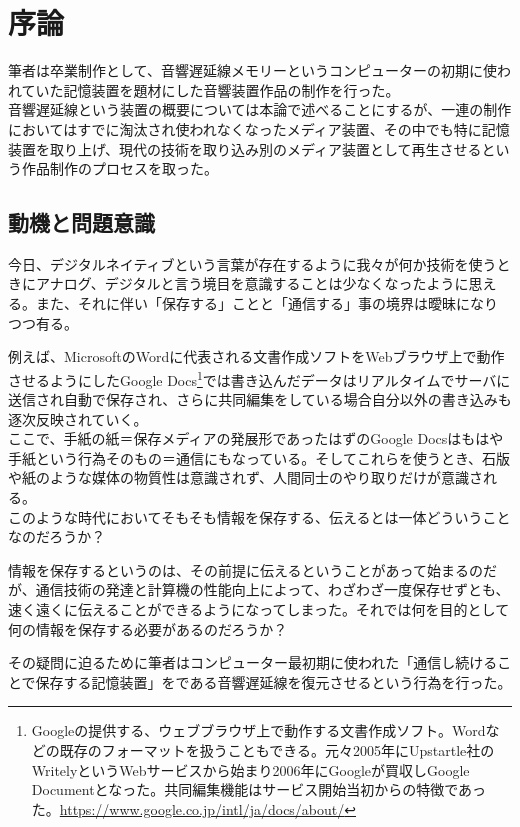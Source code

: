 \chapter{序論}\label{ux5e8fux8ad6}

筆者は卒業制作として、音響遅延線メモリーというコンピューターの初期に使われていた記憶装置を題材にした音響装置作品の制作を行った。\\
音響遅延線という装置の概要については本論で述べることにするが、一連の制作においてはすでに淘汰され使われなくなったメディア装置、その中でも特に記憶装置を取り上げ、現代の技術を取り込み別のメディア装置として再生させるという作品制作のプロセスを取った。

\section{動機と問題意識}\label{ux52d5ux6a5fux3068ux554fux984cux610fux8b58}

今日、デジタルネイティブという言葉が存在するように我々が何か技術を使うときにアナログ、デジタルと言う境目を意識することは少なくなったように思える。また、それに伴い「保存する」ことと「通信する」事の境界は曖昧になりつつ有る。

例えば、MicrosoftのWordに代表される文書作成ソフトをWebブラウザ上で動作させるようにしたGoogle
Docs\footnote{Googleの提供する、ウェブブラウザ上で動作する文書作成ソフト。Wordなどの既存のフォーマットを扱うこともできる。元々2005年にUpstartle社のWritelyというWebサービスから始まり2006年にGoogleが買収しGoogle
  Documentとなった。共同編集機能はサービス開始当初からの特徴であった。\url{https://www.google.co.jp/intl/ja/docs/about/}}では書き込んだデータはリアルタイムでサーバに送信され自動で保存され、さらに共同編集をしている場合自分以外の書き込みも逐次反映されていく。\\
ここで、手紙の紙＝保存メディアの発展形であったはずのGoogle
Docsはもはや手紙という行為そのもの＝通信にもなっている。そしてこれらを使うとき、石版や紙のような媒体の物質性は意識されず、人間同士のやり取りだけが意識される。\\
このような時代においてそもそも情報を保存する、伝えるとは一体どういうことなのだろうか？

情報を保存するというのは、その前提に伝えるということがあって始まるのだが、通信技術の発達と計算機の性能向上によって、わざわざ一度保存せずとも、速く遠くに伝えることができるようになってしまった。それでは何を目的として何の情報を保存する必要があるのだろうか？

その疑問に迫るために筆者はコンピューター最初期に使われた「通信し続けることで保存する記憶装置」をである音響遅延線を復元させるという行為を行った。

